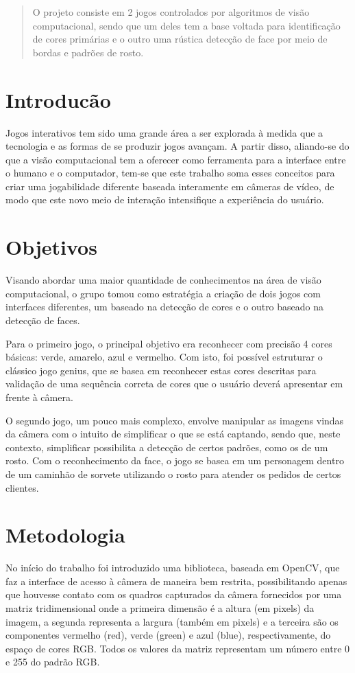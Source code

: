 \documentclass{sciposter}
\begin{document}
\begin{multicols}{3}

\begin{abstract}
O projeto consiste em 2 jogos controlados por algoritmos de visão computacional, sendo que um deles tem a base voltada para identificação de cores primárias e o outro uma rústica detecção de face por meio de bordas e padrões de rosto.
\end{abstract}

\section{Introducão}
Jogos interativos tem sido uma grande área a ser explorada à medida que a tecnologia e as formas de se produzir jogos avançam. A partir disso, aliando-se do que a visão computacional tem a oferecer como ferramenta para a interface entre o humano e o computador, tem-se que este trabalho soma esses conceitos para criar uma jogabilidade diferente baseada interamente em câmeras de vídeo, de modo que este novo meio de interação intensifique a experiência do usuário.

\newcommand{\imsize}{0.45\columnwidth}


\section{Objetivos}
Visando abordar uma maior quantidade de conhecimentos na área de visão computacional, o grupo tomou como estratégia a criação de dois jogos com interfaces diferentes, um baseado na detecção de cores e o outro baseado na detecção de faces.

Para o primeiro jogo, o principal objetivo era reconhecer com precisão 4 cores básicas: verde, amarelo, azul e vermelho. Com isto, foi possível estruturar o clássico jogo genius, que se basea em reconhecer estas cores descritas para validação de uma sequência correta de cores que o usuário deverá apresentar em frente à câmera.

O segundo jogo, um pouco mais complexo, envolve manipular as imagens vindas da câmera com o intuito de simplificar o que se está captando, sendo que, neste contexto, simplificar possibilita a detecção de certos padrões, como os de um rosto. Com o reconhecimento da face, o jogo se basea em um personagem dentro de um caminhão de sorvete utilizando o rosto para atender os pedidos de certos clientes.

\section{Metodologia}
No início do trabalho foi introduzido uma biblioteca, baseada em OpenCV, que faz a interface de acesso à câmera de maneira bem restrita, possibilitando apenas que houvesse contato com os quadros capturados da câmera fornecidos por uma matriz tridimensional onde a primeira dimensão é a altura (em pixels) da imagem, a segunda representa a largura (também em pixels) e a terceira são os componentes vermelho (red), verde (green) e azul (blue), respectivamente, do espaço de cores RGB. Todos os valores da matriz representam um número entre 0 e 255 do padrão RGB.


\end{multicols}
\end{document}
